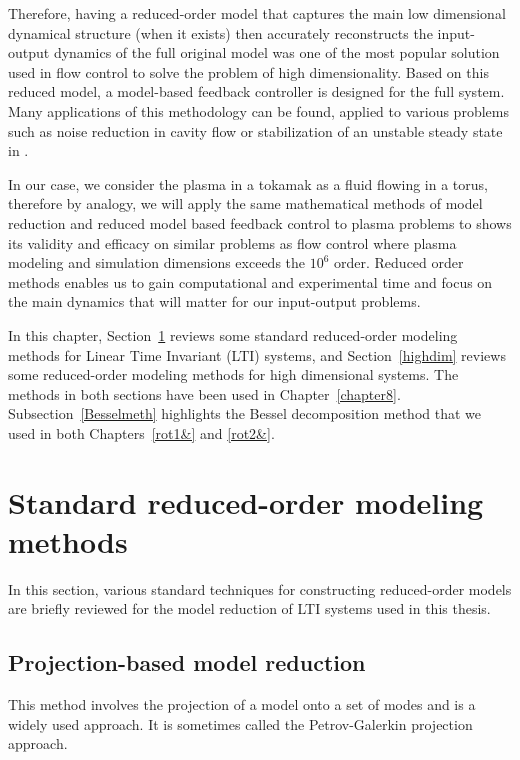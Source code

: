 \documentclass[12pt,lot, lof]{puthesis}
\begin{document}
Therefore, having a reduced-order model that captures the main low dimensional dynamical structure (when it exists) then accurately reconstructs the input-output dynamics of the full original model was one of the most popular solution used in flow control to solve the problem of high dimensionality. Based on this reduced model, a model-based feedback controller is designed for the full system. Many applications of this methodology can be found, applied to various problems such as noise reduction in cavity flow \cite{Rowley05} or stabilization of an unstable steady state in \cite{Ahuja10}.

In our case, we consider the plasma in a tokamak as a fluid flowing in a torus, therefore by analogy, we will apply the same mathematical methods of model reduction and reduced model based feedback control to plasma problems to shows its  validity and efficacy on similar problems as flow control where plasma modeling and simulation dimensions exceeds the $10^6$ order. Reduced order methods enables us to gain computational and experimental time and focus on the main dynamics that will matter for our input-output problems. 

In this chapter, Section~\ref{standard} reviews some standard reduced-order modeling methods for Linear Time Invariant (LTI) systems, and Section~\ref{highdim} reviews some reduced-order modeling methods for high dimensional systems. The methods in both sections have been used in Chapter~\ref{chapter8}. Subsection~\ref{Besselmeth} highlights the Bessel decomposition method that we used in both Chapters~\ref{rot1&} and \ref{rot2&}.


\section{Standard reduced-order modeling methods}
\label{standard}
In this section, various standard techniques for constructing reduced-order models are briefly reviewed  for the model reduction of LTI systems used in this thesis.

\subsection{Projection-based model reduction}
This method involves the projection of a model onto a set of modes and is a widely used approach. It is sometimes called the Petrov-Galerkin projection approach.
\end{document}
